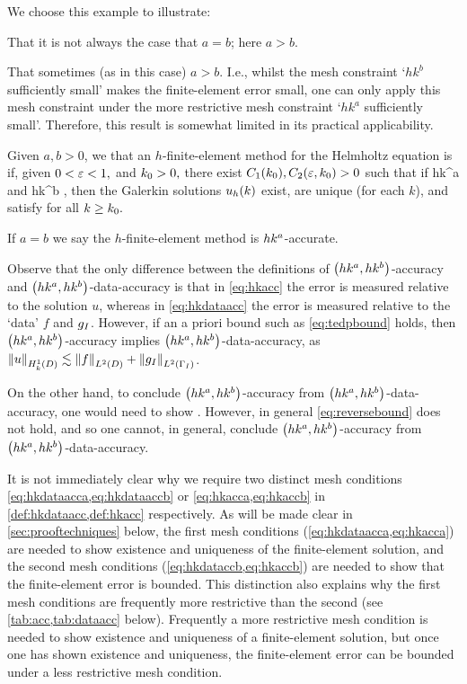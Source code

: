 We choose this example to illustrate:
\bit
\item That it is not always the case that $a=b$; here $a > b.$
\item That sometimes (as in this case) $a > b.$ I.e., whilst the mesh constraint `$hk^b$ sufficiently small' makes the finite-element error small, one can only apply this mesh constraint under the more restrictive mesh constraint `$hk^a$ sufficiently small'. Therefore, this result is somewhat limited in its practical applicability.
\eit
\ere

\bde[$\hk{a}{b}$-accurate]\label{def:hkacc}
Given $a,b>0$, we that an $h$-finite-element method for the Helmholtz equation is  if, given $0 < \varepsilon < 1,$ and $k_{0} > 0,$ there exist $C_{1}(k_{0}), C_{2}(\varepsilon,k_{0}) > 0$ such that if
\beq\label{eq:hkacca}
hk^a \leq \Co
\eeq
and
\beq\label{eq:hkaccb}
hk^b \leq \Ct,
\eeq
then the Galerkin solutions $u_{h}(k)$ exist, are unique (for each $k$), and satisfy
\beq\label{eq:hkacc}
 \leq \eps
\eeq
for all $k \geq k_{0}.$

If $a=b$ we say the $h$-finite-element method is $hk^{a}$-accurate.
\ede


Observe that the only difference between the definitions of $\hk{a}{b}$-accuracy and $\hk{a}{b}$-data-accuracy is that in \cref{eq:hkacc} the error is measured relative to the solution $u$, whereas in \cref{eq:hkdataacc} the error is measured relative to the `data' $f$ and $g_{I}$. However, if an a priori bound such as \cref{eq:tedpbound} holds, then $\hk{a}{b}$-accuracy implies $\hk{a}b$-data-accuracy, as $\NHokD{u} \lesssim \NLtD{f} + \NLtGI{\gI}$.

On the other hand, to conclude $\hk{a}{b}$-accuracy from $\hk{a}b$-data-accuracy, one would need to show
\beq\label{eq:reversebound}
 \lesssim {}.
\eeq
However, in general \cref{eq:reversebound} does not hold, and so one cannot, in general, conclude $\hk{a}{b}$-accuracy from $\hk{a}{b}$-data-accuracy.
\ere

It is not immediately clear why we require two distinct mesh conditions \cref{eq:hkdataacca,eq:hkdataaccb} or \cref{eq:hkacca,eq:hkaccb} in \cref{def:hkdataacc,def:hkacc} respectively. As will be made clear in \cref{sec:prooftechniques} below, the first mesh conditions (\cref{eq:hkdataacca,eq:hkacca}) are needed to show existence and uniqueness of the finite-element solution, and the second mesh conditions (\cref{eq:hkdataccb,eq:hkaccb}) are needed to show that the finite-element error is bounded. This distinction also explains why the first mesh conditions are frequently more restrictive than the second (see \cref{tab:acc,tab:dataacc} below). Frequently a more restrictive mesh condition is needed to show existence and uniqueness of a finite-element solution, but once one has shown existence and uniqueness, the finite-element error can be bounded under a less restrictive mesh condition.

